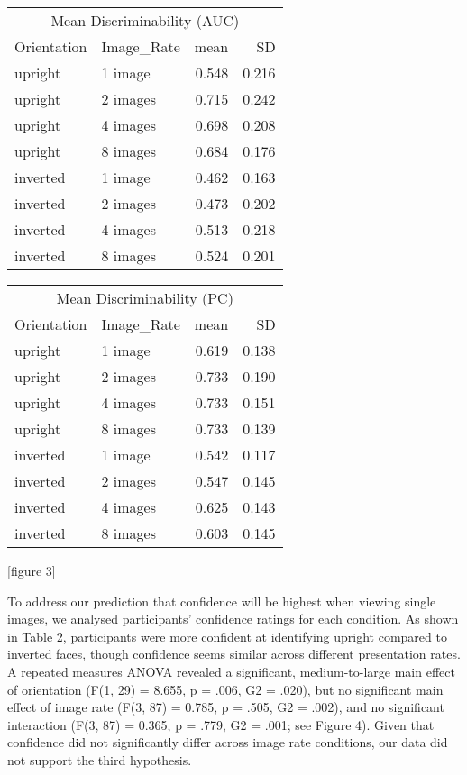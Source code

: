 \documentclass[
  english,
  man]{apa6}
\begin{document}
\begin{tabular}{l|l|r|r}
\hline
\multicolumn{4}{c|}{Mean Discriminability (AUC)} \\
\cline{1-4}
Orientation & Image\_Rate & mean & SD\\
\hline
upright & 1 image & 0.548 & 0.216\\
\hline
upright & 2 images & 0.715 & 0.242\\
\hline
upright & 4 images & 0.698 & 0.208\\
\hline
upright & 8 images & 0.684 & 0.176\\
\hline
inverted & 1 image & 0.462 & 0.163\\
\hline
inverted & 2 images & 0.473 & 0.202\\
\hline
inverted & 4 images & 0.513 & 0.218\\
\hline
inverted & 8 images & 0.524 & 0.201\\
\hline
\end{tabular}

\begin{tabular}{l|l|r|r}
\hline
\multicolumn{4}{c|}{Mean Discriminability (PC)} \\
\cline{1-4}
Orientation & Image\_Rate & mean & SD\\
\hline
upright & 1 image & 0.619 & 0.138\\
\hline
upright & 2 images & 0.733 & 0.190\\
\hline
upright & 4 images & 0.733 & 0.151\\
\hline
upright & 8 images & 0.733 & 0.139\\
\hline
inverted & 1 image & 0.542 & 0.117\\
\hline
inverted & 2 images & 0.547 & 0.145\\
\hline
inverted & 4 images & 0.625 & 0.143\\
\hline
inverted & 8 images & 0.603 & 0.145\\
\hline
\end{tabular}

{[}figure 3{]}

To address our prediction that confidence will be highest when viewing single images, we analysed participants' confidence ratings for each condition. As shown in Table 2, participants were more confident at identifying upright compared to inverted faces, though confidence seems similar across different presentation rates. A repeated measures ANOVA revealed a significant, medium-to-large main effect of orientation (F(1, 29) = 8.655, p = .006, G2 = .020), but no significant main effect of image rate (F(3, 87) = 0.785, p = .505, G2 = .002), and no significant interaction (F(3, 87) = 0.365, p = .779, G2 = .001; see Figure 4). Given that confidence did not significantly differ across image rate conditions, our data did not support the third hypothesis.
\end{document}
